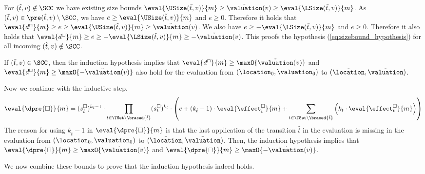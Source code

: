 For $(\tilde{t}, v) \notin \SCC$ we have existing size bounds $\eval{\USize(\tilde{t}, v)}{m} \geq \tilde{\valuation}(v) \geq \eval{\LSize(\tilde{t}, v)}{m}$.
As $(\tilde{t}, v) \in \pre(\hat{t}, v) \setminus \SCC$, we have $e \geq \eval{\USize(\tilde{t}, v)}{m}$ and $e \geq 0$.
Therefore it holds that $\eval{d^\sqcap}{m} \geq e \geq \eval{\USize(\tilde{t}, v)}{m} \geq \tilde{\valuation}(v)$.
We also have $e \geq -\eval{\LSize(\tilde{t}, v)}{m}$ and $e \geq 0$.
Therefore it also holds that $\eval{d^\sqcup}{m} \geq e \geq -\eval{\LSize(\tilde{t}, v)}{m} \geq -\tilde{\valuation}(v)$.
This proofs the hypothesis (\ref{eq:sizebound_hypothesis}) for all incoming $(\tilde{t}, v) \notin \SCC$.

If $(\tilde{t}, v) \in \SCC$, then the induction hypothesis implies that $\eval{d^\sqcap}{m} \geq \maxO{\tilde{\valuation}(v)}$ and $\eval{d^\sqcup}{m} \geq \maxO{-\tilde{\valuation}(v)}$ also hold for the evaluation from $(\location_0, \valuation_0)$ to $(\tilde{\location}, \tilde{\valuation})$.

Now we continue with the inductive step.
\begin{equation} \label{eq:induction_consequence}
  \eval{\dpre{\square}}{m} = (s^\square_{\hat{t}})^{k_{\hat{t}} - 1} \cdot \prod_{t \in \TSet \setminus \braced{\hat{t}}} (s^\square_t)^{k_t} \cdot \left( e + \left( k_{\hat{t}} - 1 \right) \cdot \eval{\effect^\square_{\hat{t}}}{m} + \sum_{t \in \TSet \setminus \braced{\hat{t}}} \left( k_t \cdot \eval{\effect^\square_t}{m} \right) \right)
\end{equation}
The reason for using $k_{\hat{t}} - 1$ in $\eval{\dpre{\square}}{m}$ is that the last application of the transition $\hat{t}$ in the evaluation is missing in the evaluation from $(\location_0, \valuation_0)$ to $(\tilde{\location}, \tilde{\valuation})$.
Then, the induction hypothesis implies that $\eval{\dpre{\sqcap}}{m} \geq \maxO{\tilde{\valuation}(v)}$ and $\eval{\dpre{\sqcap}}{m} \geq \maxO{-\tilde{\valuation}(v)}$.

We now combine these bounds to prove that the induction hypothesis indeed holds.

